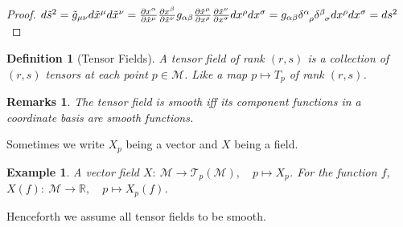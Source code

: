 \documentclass[a4paper]{article}
\newtheorem{eg}{Example}[section]
\newtheorem{remarks}{Remarks}[section]
\theoremstyle{new}
\newtheorem{defi}{Definition}[section]
\begin{document}
\begin{proof}
$d\tilde{s}^2=\tilde{g}_{\mu\nu}d\tilde{x}^\mu d\tilde{x}^\nu=\frac{\partial x^\alpha}{\partial\tilde{x}^\mu}\frac{\partial x^\beta}{\partial\tilde{x}^\nu}g_{\alpha\beta}\frac{\partial\tilde{x}^\mu}{\partial x^\rho}\frac{\partial\tilde{x}^\nu}{\partial x^\sigma}dx^\rho dx^\sigma=g_{\alpha\beta}\tensor*{\delta}{*_{}^{\alpha}_{\rho}}\tensor*{\delta}{*_{}^{\beta}_{\sigma}}dx^\rho dx^\sigma=ds^2$
\end{proof}
\begin{defi}[Tensor Fields]
A tensor field of rank $(r,s)$ is a collection of $(r,s)$ tensors at each point $p\in\mathcal{M}$. Like a map $p\mapsto T_p$ of rank $(r,s)$.
\end{defi}
\begin{remarks}
The tensor field is smooth iff its component functions in a coordinate basis are smooth functions.
\end{remarks}
Sometimes we write $X_p$ being a vector and $X$ being a field.
\begin{eg}
A vector field $X:~\mathcal{M}\rightarrow\mathcal{T}_p(\mathcal{M}),\quad p\mapsto X_p$. For the function $f$, $X(f):~\mathcal{M}\rightarrow\mathbb{R},\quad p\mapsto X_p(f)$.
\end{eg}
Henceforth we assume all tensor fields to be smooth.
\end{document}
